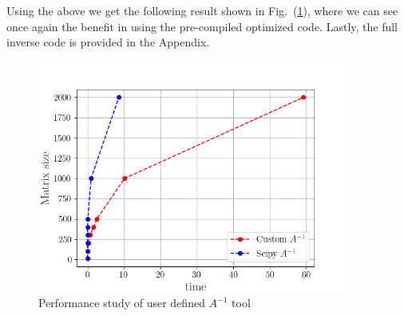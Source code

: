Using the above we get the following result shown in
Fig.~(\ref{fig:inverse-study}), where we can see once again the benefit in
using the pre-compiled optimized code. Lastly, the full inverse code is
provided in the Appendix.
\begin{figure}[H]
    \includegraphics[height=3.0in]{media/exercise-8.png}
    \caption{Performance study of user defined $A^{-1}$ tool}
    \label{fig:inverse-study}
\end{figure}
